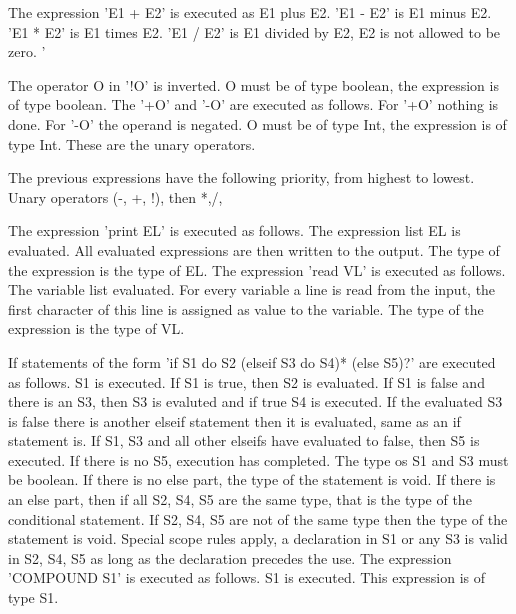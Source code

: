 \documentclass[paper=a4, fontsize=11pt]{article}
\numberwithin{equation}{section}		%
\numberwithin{figure}{section}			%
\numberwithin{table}{section}				%
\begin{document}
The expression 'E1 + E2' is executed as E1 plus E2. 'E1 - E2' is E1 minus E2. 'E1 * E2' is E1 times E2. 'E1 / E2' is E1 divided by E2, E2 is not allowed to be zero. '%

The operator O in '!O' is inverted. O must be of type boolean, the expression is of type boolean. The '+O' and '-O' are executed as follows. For '+O' nothing is done. For '-O' the operand is negated. O must be of type Int, the expression is of type Int. These are the unary operators.

The previous expressions have the following priority, from highest to lowest. Unary operators (-, +, !), then *,/,%

The expression 'print EL' is executed as follows. The expression list EL is evaluated. All evaluated expressions are then written to the output. The type of the expression is the type of EL.
The expression 'read VL' is executed as follows. The variable list evaluated. For every variable a line is read from the input, the first character of this line is assigned as value to the variable. The type of the expression is the type of VL.

If statements of the form 'if S1 do S2 (elseif S3 do S4)* (else S5)?' are executed as follows. S1 is executed. If S1 is true, then S2 is evaluated. If S1 is false and there is an S3, then S3 is evaluted and if true S4 is executed. If the evaluated S3 is false there is another elseif statement then it is evaluated, same as an if statement is. If S1, S3 and all other elseifs have evaluated to false, then S5 is executed. If there is no S5, execution has completed. The type os S1 and S3 must be boolean. If there is no else part, the type of the statement is void. If there is an else part, then if all S2, S4, S5 are the same type, that is the type of the conditional statement. If S2, S4, S5 are not of the same type then the type of the statement is void. Special scope rules apply, a declaration in S1 or any S3 is valid in S2, S4, S5 as long as the declaration precedes the use. 
The expression 'COMPOUND S1' is executed as follows. S1 is executed. This expression is of type S1.
\end{document}
